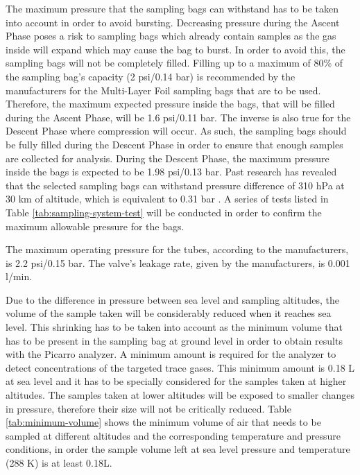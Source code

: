 %
The maximum pressure that the sampling bags can withstand has to be taken into account in order to avoid bursting. Decreasing pressure during the Ascent Phase poses a risk to sampling bags which already contain samples as the gas inside will expand which may cause the bag to burst. In order to avoid this, the sampling bags will not be completely filled. Filling up to a maximum of 80\% of the sampling bag's capacity (2 psi/0.14 bar) is recommended by the manufacturers for the Multi-Layer Foil sampling bags that are to be used. Therefore, the maximum expected pressure inside the bags, that will be filled during the Ascent Phase, will be 1.6 psi/0.11 bar. The inverse is also true for the Descent Phase where compression will occur. As such, the sampling bags should be fully filled during the Descent Phase in order to ensure that enough samples are collected for analysis. During the Descent Phase, the maximum pressure inside the bags is expected to be 1.98 psi/0.13 bar. Past research has revealed that the selected sampling bags can withstand pressure difference of 310 hPa at 30 km of altitude, which is equivalent to 0.31 bar \cite{LISA}. A series of tests listed in Table \ref{tab:sampling-system-test} will be conducted in order to confirm the maximum allowable pressure for the bags.

The maximum operating pressure for the tubes, according to the manufacturers, is 2.2 psi/0.15 bar. The valve's leakage rate, given by the manufacturers, is 0.001 l/min.     


Due to the difference in pressure between sea level and sampling altitudes, the volume of the sample taken will be considerably reduced when it reaches sea level. This shrinking has to be taken into account as the minimum volume that has to be present in the sampling bag at ground level in order to obtain results with the Picarro analyzer. A minimum amount is required for the analyzer to detect concentrations of the targeted trace gases. This minimum amount is 0.18 L at sea level and it has to be specially considered for the samples taken at higher altitudes. The samples taken at lower altitudes will be exposed to smaller changes in pressure, therefore their size will not be critically reduced. Table \ref{tab:minimum-volume} shows the minimum volume of air that needs to be sampled at different altitudes and the corresponding temperature and pressure conditions, in order the sample volume left at sea level pressure and temperature (288 K)  is at least 0.18L.  


